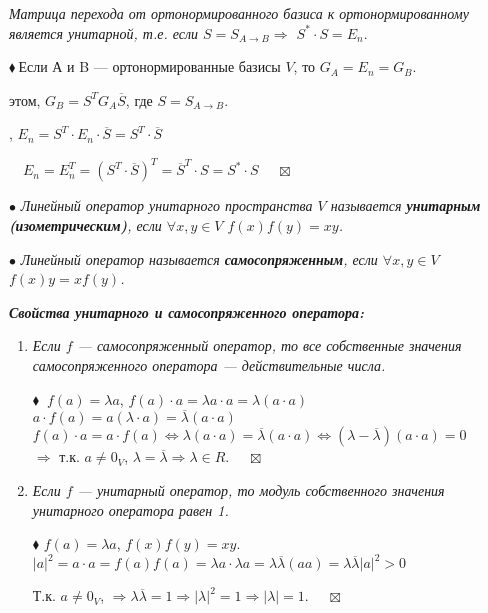 \documentclass[a4paper, 12pt]{report}
\begin{document}
	\textit{Матрица перехода от ортонормированного базиса к ортонормированному
		является унитарной, т.е. если $S=S_{A\rightarrow B} \Rightarrow$ $S^*\cdot S=E_n$}.
	\par\bigskip
	$\blacklozenge\ $Если А и B --- ортонормированные базисы $V$, то $G_A=E_n=G_B$.
	\par\bigskip
	 этом, $G_B = S^T G_A \overline{S}$, где $S=S_{A\rightarrow B}$.
	\par\bigskip
	, $E_n = S^T \cdot E_n \cdot \overline{S}=S^T \cdot \overline{S}$
	\par\bigskip
	$\quad E_n = E_n^T =  (S^T\cdot \overline{S})^T=\overline{S}^T\cdot S=S^*\cdot S$
	$ \quad \boxtimes$
	\par\bigskip
	$\bullet$\textit{ Линейный оператор унитарного пространства $V$ называется \textbf{унитарным (изометрическим)}, если $\forall x,y \in V$ $f(x)f(y)=xy$. }
	\par\bigskip
	$\bullet$\textit{ Линейный оператор называется \textbf{самосопряженным}, если $\forall x,y \in V$ $f(x)y = xf(y)$. }
	\par\bigskip
	\textit{ \textbf{Свойства унитарного и самосопряженного оператора:}}
	\begin{enumerate}
		\item \textit{Если $f$ --- самосопряженный оператор, то все собственные значения самосопряженного оператора --- действительные числа.}
		
		$\blacklozenge\ $
		$f(a)=\lambda a$, $f(a)\cdot a = \lambda a \cdot a = \lambda(a \cdot a)$\\ 
		$a \cdot f(a)  = a ( \lambda \cdot a) = \overline{\lambda}(a \cdot a)$\\
		$f(a)\cdot a = a \cdot f(a) \Leftrightarrow \lambda(a \cdot a) = \overline{\lambda}(a \cdot a)\Leftrightarrow (\lambda- \overline{\lambda})(a \cdot a)=0$\\
		$\Rightarrow $ т.к. $a \neq 0_V$, $\lambda = \overline{\lambda} \Rightarrow \lambda \in R$.
		$ \quad \boxtimes$
		
		\item  \textit{Если $f$ --- унитарный оператор, то модуль собственного значения унитарного оператора равен 1.}
		
		$\blacklozenge$
		$f(a)=\lambda a$, $f(x)f(y)=xy$.\\
		$|a|^2=a\cdot a = f(a)f(a) = \lambda a \cdot \lambda a = \lambda \overline{\lambda}(aa) = \lambda \overline{\lambda}|a|^2 >0 $
		
		Т.к. $a \neq 0_V$, $\Rightarrow \lambda \overline{\lambda} = 1 \Rightarrow |\lambda|^2=1 \Rightarrow |\lambda|=1$.
		$\quad\boxtimes$
		
	\end{enumerate}
	
\end{document}
